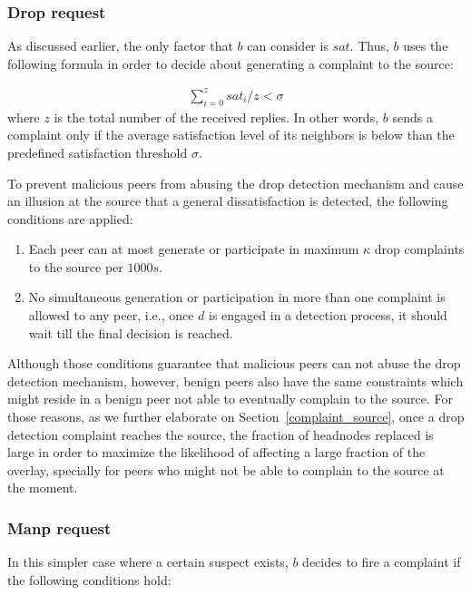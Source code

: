 \subsubsection*{Drop request}
As discussed earlier, the only factor that $b$ can consider is $sat$.
Thus, $b$ uses the following formula in order to decide about generating a complaint to the source:

\begin{align}
\label{eq:drop_satis_equation}
\sum_{i=0}^{z} sat_i/z < \sigma
\end{align}
where $z$ is the total number of the received replies. 
In other words, $b$ sends a complaint only if the average satisfaction level of its neighbors is below than the predefined satisfaction threshold $\sigma$.

To prevent malicious peers from abusing the drop detection mechanism and cause an illusion at the source that a general dissatisfaction is detected, the following conditions are applied:
\begin{enumerate}
 \item Each peer can at most generate or participate in maximum $\kappa$ drop complaints to the source per $1000s$.
 \item No simultaneous generation or participation in more than one complaint is allowed to any peer, i.e., once $d$ is engaged in a detection process, it should wait till the final decision is reached.
\end{enumerate}
Although those conditions guarantee that malicious peers can not abuse the drop detection mechanism,
however, benign peers also have the same constraints which might reside in a benign peer not able to eventually complain to the source.
For those reasons, as we further elaborate on Section~\ref{complaint_source}, once a drop detection complaint reaches the source, the fraction of headnodes replaced is large in order to maximize the likelihood of affecting a large fraction of the overlay, specially for peers who might not be able to complain to the source at the moment.

\subsubsection*{Manp request}
In this simpler case where a certain suspect exists, $b$ decides to fire a complaint if the following conditions hold:

